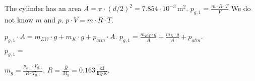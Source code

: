 The cylinder has an area \( A = \pi \cdot (d/2)^2 = 7.854 \cdot 10^{-3} \, \text{m}^2 \).  
\( p_{g,1} = \frac{m \cdot R \cdot T}{V} \)  
We do not know \( m \) and \( p \).  
\( p \cdot V = m \cdot R \cdot T \).  

\( p_{g,1} \cdot A = m_{EW} \cdot g + m_K \cdot g + p_{atm} \cdot A \).  
\( p_{g,1} = \frac{m_{EW} \cdot g}{A} + \frac{m_K \cdot g}{A} + p_{atm} \).  

\( p_{g,1} = \)  

\( m_g = \frac{p_{g,1} \cdot V_{g,1}}{R \cdot T_{g,1}} \),  
\( R = \frac{\bar{R}}{M_g} = 0.163 \, \frac{\text{kJ}}{\text{kg·K}} \).
